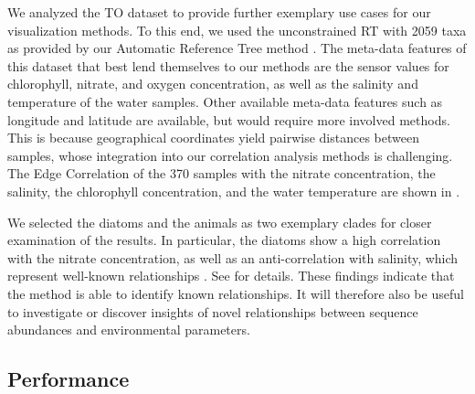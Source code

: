 We analyzed the \ac{TO} dataset to provide further exemplary use cases for our visualization methods.
To this end, we used the unconstrained  \ac{RT} with \num{2059} taxa
as provided by our Automatic Reference Tree method \cite{Czech2018}.
The meta-data features of this dataset that best lend themselves to our methods are the sensor values for
chlorophyll, nitrate, and oxygen concentration, as well as the salinity and temperature of the water samples.
Other available meta-data features such as longitude and latitude are available,
but would require more involved methods.
This is because geographical coordinates yield pairwise distances between samples,
whose integration into our correlation analysis methods is challenging.
The Edge Correlation of the \num{370} samples with the nitrate concentration, the salinity, the chlorophyll concentration,
and the water temperature are shown in .

We selected the diatoms and the animals as two exemplary clades for closer examination of the results.
In particular, the diatoms show a high correlation with the nitrate concentration,
as well as an anti-correlation with salinity, which represent well-known relationships \cite{Lozupone2007,Potapova2011}.
See  for details.
These findings indicate that the method is able to identify known relationships.
It will therefore also be useful to investigate or discover
insights of novel relationships between sequence abundances and environmental parameters.



\subsection{Performance}
\label{ch:Visualization:sec:Results:sub:Performance}

